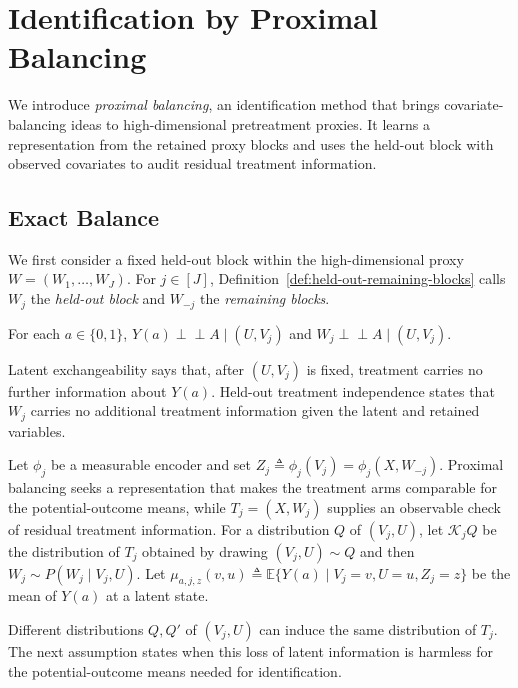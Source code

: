 \section{Identification by Proximal Balancing}
\label{sec:identification}

We introduce \emph{proximal balancing}, an identification method that brings covariate-balancing ideas \citep{hainmueller2012entropy,imai2014covariate} to high-dimensional pretreatment proxies. It learns a representation from the retained proxy blocks and uses the held-out block with observed covariates to audit residual treatment information.

\subsection{Exact Balance}
\label{sec:probe}

We first consider a fixed held-out block within the high-dimensional proxy $W=(W_1,\ldots,W_J)$. For $j\in[J]$, Definition~\ref{def:held-out-remaining-blocks} calls $W_j$ the \emph{held-out block} and $W_{-j}$ the \emph{remaining blocks}.

\begin{assumption}
\label{ass:joint-latent-exchangeability}\label{ass:held-out-separation}
	For each $a\in\{0,1\}$, $Y(a)\perp\!\!\!\perp A\mid(U,V_j)$ and $W_j\perp\!\!\!\perp A\mid(U,V_j)$.
\end{assumption}
Latent exchangeability says that, after $(U,V_j)$ is fixed, treatment carries no further information about $Y(a)$. Held-out treatment independence states that $W_j$ carries no additional treatment information given the latent and retained variables.

Let $\phi_j$ be a measurable encoder and set $Z_j\triangleq\phi_j(V_j)=\phi_j(X,W_{-j})$. Proximal balancing seeks a representation that makes the treatment arms comparable for the potential-outcome means, while $T_j=(X,W_j)$ supplies an observable check of residual treatment information. For a distribution $Q$ of $(V_j,U)$, let $\mathcal K_jQ$ be the distribution of $T_j$ obtained by drawing $(V_j,U)\sim Q$ and then $W_j\sim P(W_j\mid V_j,U)$. Let $\mu_{a,j,z}(v,u)\triangleq\mathbb E\{Y(a)\mid V_j=v,U=u,Z_j=z\}$ be the mean of $Y(a)$ at a latent state.

Different distributions $Q,Q'$ of $(V_j,U)$ can induce the same distribution of $T_j$. The next assumption states when this loss of latent information is harmless for the potential-outcome means needed for identification.

